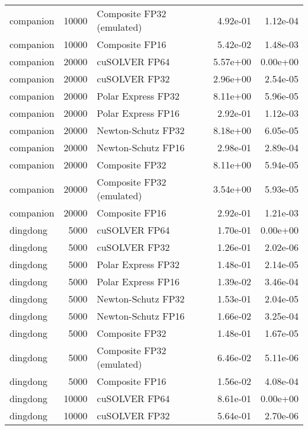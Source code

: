 \begin{table}
\begin{tabular}{lrlrr}
companion & 10000 & Composite FP32 (emulated) &  4.92e-01 &        1.12e-04 \\
companion & 10000 &            Composite FP16 &  5.42e-02 &        1.48e-03 \\
companion & 20000 &             cuSOLVER FP64 &  5.57e+00 &        0.00e+00 \\
companion & 20000 &             cuSOLVER FP32 &  2.96e+00 &        2.54e-05 \\
companion & 20000 &        Polar Express FP32 &  8.11e+00 &        5.96e-05 \\
companion & 20000 &        Polar Express FP16 &  2.92e-01 &        1.12e-03 \\
companion & 20000 &        Newton-Schutz FP32 &  8.18e+00 &        6.05e-05 \\
companion & 20000 &        Newton-Schutz FP16 &  2.98e-01 &        2.89e-04 \\
companion & 20000 &            Composite FP32 &  8.11e+00 &        5.94e-05 \\
companion & 20000 & Composite FP32 (emulated) &  3.54e+00 &        5.93e-05 \\
companion & 20000 &            Composite FP16 &  2.92e-01 &        1.21e-03 \\
 dingdong &  5000 &             cuSOLVER FP64 &  1.70e-01 &        0.00e+00 \\
 dingdong &  5000 &             cuSOLVER FP32 &  1.26e-01 &        2.02e-06 \\
 dingdong &  5000 &        Polar Express FP32 &  1.48e-01 &        2.14e-05 \\
 dingdong &  5000 &        Polar Express FP16 &  1.39e-02 &        3.46e-04 \\
 dingdong &  5000 &        Newton-Schutz FP32 &  1.53e-01 &        2.04e-05 \\
 dingdong &  5000 &        Newton-Schutz FP16 &  1.66e-02 &        3.25e-04 \\
 dingdong &  5000 &            Composite FP32 &  1.48e-01 &        1.67e-05 \\
 dingdong &  5000 & Composite FP32 (emulated) &  6.46e-02 &        5.11e-06 \\
 dingdong &  5000 &            Composite FP16 &  1.56e-02 &        4.08e-04 \\
 dingdong & 10000 &             cuSOLVER FP64 &  8.61e-01 &        0.00e+00 \\
 dingdong & 10000 &             cuSOLVER FP32 &  5.64e-01 &        2.70e-06 \\

\end{tabular}
\end{table}
